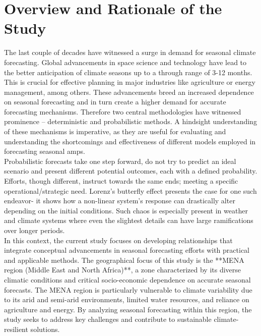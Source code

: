 \chapter{Overview and Rationale of the Study}
The last couple of decades have witnessed a surge in demand for seasonal climate forecasting. Global advancements in space science and technology have lead to the better anticipation of climate seasons up to a through range of 3-12 months. This is crucial for effective planning in major industries like agriculture or energy management, among others. These advancements breed an increased dependence on seasonal forecasting and in turn create a higher demand for accurate forecasting mechanisms. Therefore two central methodologies have witnessed prominence – deterministic and probabilistic methods. A hindsight understanding of these mechanisms is imperative, as they are useful for evaluating and understanding the shortcomings and effectiveness of different models employed in forecasting seasonal amps.\\

Probabilistic forecasts take one step forward, do not try to predict an ideal scenario and present different potential outcomes, each with a defined probability. Efforts, though different, instruct towards the same ends; meeting a specific operational/strategic need. Lorenz’s butterfly effect presents the case for one such endeavor- it shows how a non-linear system’s response can drastically alter depending on the initial conditions. Such chaos is especially present in weather and climate systems where even the slightest details can have large ramifications over longer periods.\\

In this context, the current study focuses on developing relationships that integrate conceptual advancements in seasonal forecasting efforts with practical and applicable methods. The geographical focus of this study is the **MENA region (Middle East and North Africa)**, a zone characterized by its diverse climatic conditions and critical socio-economic dependence on accurate seasonal forecasts. The MENA region is particularly vulnerable to climate variability due to its arid and semi-arid environments, limited water resources, and reliance on agriculture and energy. By analyzing seasonal forecasting within this region, the study seeks to address key challenges and contribute to sustainable climate-resilient solutions.\\




